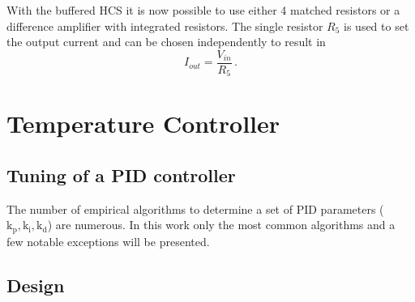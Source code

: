 With the buffered HCS it is now possible to use either \num{4} matched resistors or a difference amplifier with integrated resistors. The single resistor $R_5$ is used to set the output current and can be chosen independently to result in
\begin{equation}
    I_{out} = \frac{V_{in}}{R_5}\,.
\end{equation}


\clearpage
\section{Temperature Controller}%
\label{sec:temperature_controller}


\subsection{Tuning of a PID controller}
The number of empirical algorithms to determine a set of PID parameters ($\mathrm{k_p, k_i, k_d}$) are numerous. In this work only the most common algorithms and a few notable exceptions will be presented.
\subsection{Design}

